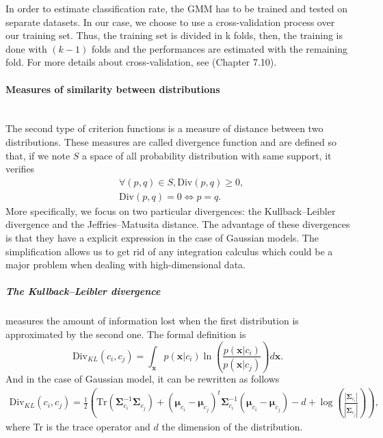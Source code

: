 \documentclass[a4paper,11pt,DIV=16,abstracton]{scrartcl}
\begin{document}
            In order to estimate classification rate, the GMM has to be trained and tested on separate datasets. In our case, we choose to use a cross-validation process over our training set. Thus, the training set is divided in k folds, then, the training is done with $(k-1)$ folds and the performances are estimated with the remaining fold. For more details about cross-validation, see \cite{opac-b1127878} (Chapter 7.10).

            \paragraph{Measures of similarity between distributions}

            \hspace{0pt} \\
            The second type of criterion functions is a measure of distance between two distributions. These measures are called divergence function and are defined so that, if we note $S$ a space of all probability distribution with same support, it verifies
            \begin{align*}
                &\forall (p,q) \in S, \text{Div}(p,q) \geq 0, \\
                &\text{Div}(p,q) = 0 \Leftrightarrow p = q.
            \end{align*}
            More specifically, we focus on two particular divergences: the Kullback–Leibler divergence and the Jeffries–Matusita distance. The advantage of these divergences is that they have a explicit expression in the case of Gaussian models. The simplification allows us to get rid of any integration calculus which could be a major problem when dealing with high-dimensional data.


            \subparagraph{The Kullback–Leibler divergence} measures the amount of information lost when the first distribution is approximated by the second one. The formal definition is
            \begin{equation}
                \text{Div}_{KL}(c_i,c_j) = \int_\mathbf{x} p(\mathbf{x}|c_i) \ln(\frac{p(\mathbf{x}|c_i)}{p(\mathbf{x}|c_j)}) d\mathbf{x}.
            \end{equation}
            And in the case of Gaussian model, it can be rewritten as follows
            \begin{align}
                \text{Div}_{KL}(c_i,c_j) = \frac{1}{2} \left( \text{Tr} (\boldsymbol{\Sigma}_{c_i}^{-1} \boldsymbol{\Sigma}_{c_j}) + (\boldsymbol{\mu}_{c_i} - \boldsymbol{\mu}_{c_j})^t \boldsymbol{\Sigma}_{c_i}^{-1} (\boldsymbol{\mu}_{c_i} - \boldsymbol{\mu}_{c_j}) - d + \log \left( \frac{|\boldsymbol{\Sigma}_{c_i}|}{|\boldsymbol{\Sigma}_{c_j}|} \right) \right),
            \end{align}
            where Tr is the trace operator and $d$ the dimension of the distribution.
\end{document}
